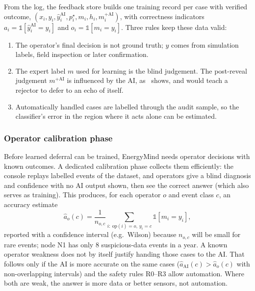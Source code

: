 \documentclass[11pt,a4paper]{article}
\renewcommand{\_}{\textunderscore\allowbreak}
\begin{document}
From the log, the feedback store builds one training record per case with verified outcome,
$(x_i,y_i,\hat y^{\mathrm{AI}}_i,p^\star_i,m_i,h_i,m^{+\mathrm{AI}}_i)$, with correctness indicators
$a_i=\mathbb 1[\hat y^{\mathrm{AI}}_i=y_i]$ and $o_i=\mathbb 1[m_i=y_i]$. Three rules keep these data valid:
\begin{enumerate}[leftmargin=*,itemsep=1pt]
\item The operator's final decision is not ground truth; $y$ comes from simulation labels, field inspection or
later confirmation.
\item The expert label $m$ used for learning is the blind judgement. The post-reveal judgement $m^{+\mathrm{AI}}$
is influenced by the AI, as~\cite{benz} shows, and would teach a rejector to defer to an echo of itself.
\item Automatically handled cases are labelled through the audit sample, so the classifier's error in the region
where it acts alone can be estimated.
\end{enumerate}

\subsubsection{Operator calibration phase}
Before learned deferral can be trained, EnergyMind needs operator decisions with known outcomes. A dedicated
calibration phase collects them efficiently: the console replays labelled events of the dataset, and operators
give a blind diagnosis and confidence with no AI output shown, then see the correct answer (which also serves as
training). This produces, for each operator $o$ and event class $c$, an accuracy estimate
\begin{equation}
\hat a_o(c)=\frac{1}{n_{o,c}}\sum_{i:\ \mathrm{op}(i)=o,\ y_i=c}\mathbb 1[m_i=y_i],
\end{equation}
reported with a confidence interval (e.g.\ Wilson) because $n_{o,c}$ will be small for rare events; node N1 has
only 8 suspicious-data events in a year. A known operator weakness does not by itself justify handing those
cases to the AI. That follows only if the AI is more accurate on the same cases ($\hat a_{\mathrm{AI}}(c)>\hat a_o(c)$
with non-overlapping intervals) and the safety rules R0--R3 allow automation. Where both are weak, the answer
is more data or better sensors, not automation.
\end{document}
